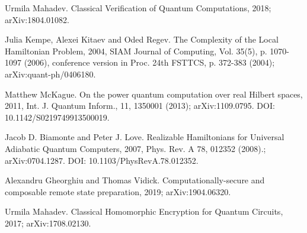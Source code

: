 \documentclass{article}
\theoremstyle{definition}
\begin{document}
\begin{thebibliography}{9}
	Urmila Mahadev.
	\newblock Classical Verification of Quantum Computations, 2018;
	\newblock arXiv:1804.01082.

	Julia Kempe, Alexei Kitaev and Oded Regev.
	\newblock The Complexity of the Local Hamiltonian Problem, 2004,
	\newblock SIAM Journal of Computing, Vol. 35(5), p. 1070-1097 (2006),
		conference version in Proc. 24th FSTTCS, p. 372-383 (2004);
	\newblock arXiv:quant-ph/0406180.

	Matthew McKague.
	\newblock On the power quantum computation over real Hilbert spaces, 2011,
	\newblock Int. J. Quantum Inform., 11, 1350001 (2013);
	\newblock arXiv:1109.0795.
	\newblock DOI: 10.1142/S0219749913500019.
	
	Jacob D. Biamonte and Peter J. Love.
	\newblock Realizable Hamiltonians for Universal Adiabatic Quantum Computers, 2007,
	\newblock Phys. Rev. A 78, 012352 (2008).;
	\newblock arXiv:0704.1287.
	\newblock DOI: 10.1103/PhysRevA.78.012352.

	Alexandru Gheorghiu and Thomas Vidick.
	\newblock Computationally-secure and composable remote state preparation, 2019;
	\newblock arXiv:1904.06320.

	Urmila Mahadev.
	\newblock Classical Homomorphic Encryption for Quantum Circuits, 2017;
	\newblock arXiv:1708.02130.

\end{thebibliography}
\end{document}

